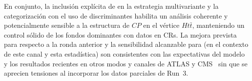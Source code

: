 En conjunto, la inclusión explícita de \thqb en la estrategia multivariante y la categorización con el uso de discriminantes habilita un análisis coherente y potencialmente sensible a la estructura de $CP$ en el vértice $Ht\bar t$, manteniendo un control sólido de los fondos dominantes con datos en CRs. La mejora prevista para \ttH respecto a la ronda anterior y la sensibilidad alcanzable para \thqb (en el contexto de este canal y esta estadística) son consistentes con las expectativas del modelo y los resultados recientes en otros modos y canales de ATLAS y CMS~\cite{Sirunyan_2021, 2025, ATLAS:2025irr, thgammagamma} sin que se aprecien tensiones al incorporar los datos parciales de Run~3.
